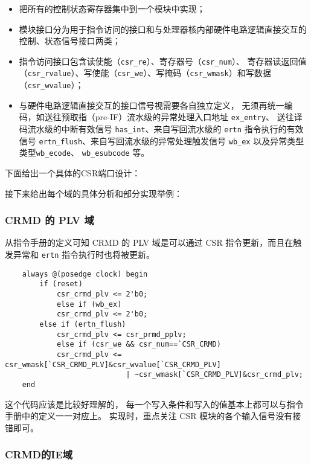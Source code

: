 \begin{itemize}
    \item 把所有的控制状态寄存器集中到一个模块中实现；
    \item 模块接口分为用于指令访问的接口和与处理器核内部硬件电路逻辑直接交互的控制、状态信号接口两类；
    \item 指令访问接口包含读使能（\texttt{csr\_re}）、寄存器号（\texttt{csr\_num}）、
    寄存器读返回值（\texttt{csr\_rvalue}）、写使能（\texttt{csr\_we}）、写掩码（\texttt{csr\_wmask}）和写数据（\texttt{csr\_wvalue}）；
    \item 与硬件电路逻辑直接交互的接口信号视需要各自独立定义，
    无须再统一编码，如送往预取指（pre-IF）流水级的异常处理入口地址 \texttt{ex\_entry}、
    送往译码流水级的中断有效信号 \texttt{has\_int}、来自写回流水级的 \texttt{ertn} 指令执行的有效信号 
    \texttt{ertn\_flush}、来自写回流水级的异常处理触发信号 \texttt{wb\_ex} 以及异常类型类型\texttt{wb\_ecode}、
    \texttt{wb\_esubcode} 等。
\end{itemize}

下面给出一个具体的CSR端口设计：

接下来给出每个域的具体分析和部分实现举例：

\subsubsection{CRMD 的 PLV 域}

从指令手册的定义可知 CRMD 的 PLV 域是可以通过 CSR 指令更新，而且在触发异常和 \texttt{ertn} 指令执行时也将被更新。

\begin{lstlisting}
    always @(posedge clock) begin
        if (reset)
            csr_crmd_plv <= 2'b0;
            else if (wb_ex)
            csr_crmd_plv <= 2'b0;
        else if (ertn_flush)
            csr_crmd_plv <= csr_prmd_pplv;
            else if (csr_we && csr_num==`CSR_CRMD)
            csr_crmd_plv <= csr_wmask[`CSR_CRMD_PLV]&csr_wvalue[`CSR_CRMD_PLV]
                            | ~csr_wmask[`CSR_CRMD_PLV]&csr_crmd_plv;
    end
\end{lstlisting}

这个代码应该是比较好理解的，
每一个写入条件和写入的值基本上都可以与指令手册中的定义一一对应上。
实现时，重点关注 CSR 模块的各个输入信号没有接错即可。

\subsubsection{CRMD的IE域}


